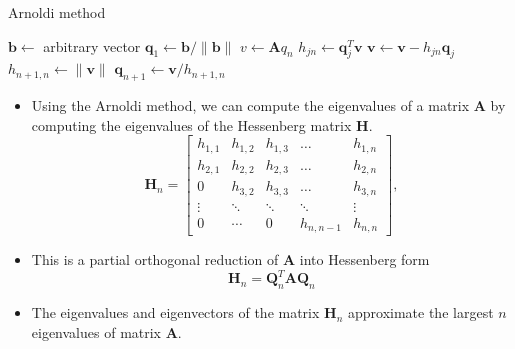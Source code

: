 \documentclass{beamer}
\begin{document}
\begin{frame}[fragile]{Arnoldi method}

        \begin{algorithm}[H]
            \caption{Arnoldi Iteration}
            \begin{algorithmic}
                \State $\mathbf{b} \gets$ arbitrary vector
                \State $\mathbf{q}_1 \gets \mathbf{ b} / \|\mathbf{b}\|$
                    \State $v \gets \mathbf{A} q_n$
                        \State $h_{jn} \gets \mathbf{q}_j^T \mathbf{v}$
                        \State $\mathbf{v} \gets \mathbf{v} - h_{jn} \mathbf{q}_j$ 
                    \EndFor
                    \State $h_{n+1,n} \gets \|\mathbf{v}\|$ 
                    \State $\mathbf{q}_{n+1} \gets \mathbf{v} / h_{n+1,n}$
                \EndFor
            \end{algorithmic}
        \end{algorithm}
\end{frame}

\begin{frame}
    \begin{itemize} 
       \item Using the Arnoldi method, we can compute the eigenvalues of a matrix $\mathbf{A}$ by computing the eigenvalues of the Hessenberg matrix $\mathbf{H}$.
        $$
\mathbf{H}_n=\left[\begin{array}{ccccc}
h_{1,1} & h_{1,2} & h_{1,3} & \ldots & h_{1, n} \\
h_{2,1} & h_{2,2} & h_{2,3} & \ldots & h_{2, n} \\
0 & h_{3,2} & h_{3,3} & \ldots & h_{3, n} \\
\vdots & \ddots & \ddots & \ddots & \vdots \\
0 & \cdots & 0 & h_{n, n-1} & h_{n, n}
\end{array}\right],
$$
\item This is a partial orthogonal reduction of $\mathbf{A}$ into Hessenberg form
$$
\mathbf{H}_n=\mathbf{Q}_n^{T}  \mathbf{A} \mathbf{Q}_n
$$
\item The eigenvalues
and eigenvectors of the matrix $\mathbf{H}_n$ approximate the largest $n$ eigenvalues of matrix $\mathbf{A}$.
    \end{itemize}
\end{frame}
\end{document}
